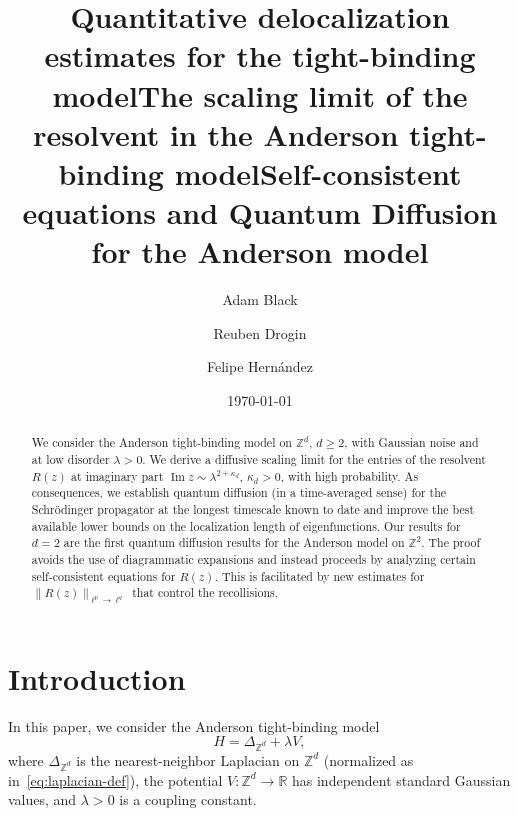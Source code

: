 \documentclass[11pt]{amsart}
\title{Quantitative delocalization estimates for the tight-binding model}
\title{The scaling limit of the resolvent in the Anderson tight-binding model}
\title{Self-consistent equations and Quantum Diffusion for the Anderson model}
\author{Adam Black}
\author{Reuben Drogin}
\author{Felipe Hern\'{a}ndez}
\date{\today}
\def\Real{{\mathbb R}}
\def\bbZ{{\mathbb Z}}
\def\Z{{\mathbb{Z}}}
\newcommand{\Impt}{\operatorname*{Im}}
\numberwithin{equation}{section}
\numberwithin{theorem}{section}
\begin{document}
\begin{abstract}
We consider the Anderson tight-binding model on $\Z^d$, $d\geq 2$, with Gaussian noise and at low disorder $\lambda>0$. We derive a diffusive scaling limit for the entries of the resolvent $R(z)$ at imaginary part $\Impt z\sim\lambda^{2+\kappa_d}$, $\kappa_d>0$, with high probability.
As consequences, we establish quantum diffusion (in a time-averaged sense) for the Schr\"{o}dinger propagator at the longest timescale known to date and improve the best available lower bounds on the localization length of eigenfunctions.
Our results for $d=2$ are the first quantum diffusion results for the Anderson model on $\bbZ^2$. The proof avoids the use of diagrammatic expansions and instead proceeds by analyzing certain self-consistent equations for $R(z)$. This is facilitated by new estimates for $\|R(z)\|_{\ell^p\rightarrow \ell^q}$ that control the recollisions.
\end{abstract}
\maketitle
\section{Introduction}

In this paper, we consider the Anderson tight-binding model
\begin{equation}
\label{eq:tbm}
H=\Delta_{\Z^d}+\lambda V,
\end{equation}
where $\Delta_{\Z^{d}}$ is the nearest-neighbor Laplacian on $\Z^{d}$ (normalized as in~\eqref{eq:laplacian-def}), the potential $V:\Z^{d}\to \Real$ has independent standard Gaussian values, and $\lambda>0$ is a coupling constant.
\end{document}
